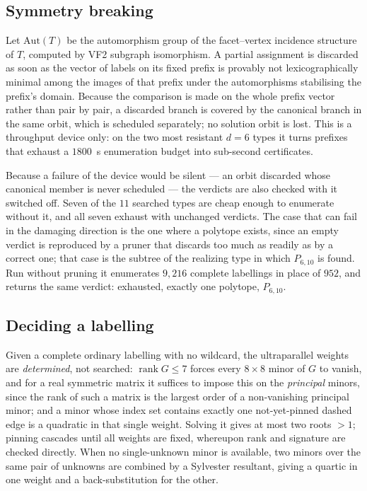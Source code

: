 \documentclass[11pt,reqno]{amsart}
\theoremstyle{plain}
\theoremstyle{definition}
\DeclareMathOperator{\rank}{rank}
\newcommand{\Gr}{G}
\newcommand{\PP}{P_{6,10}}
\newcommand{\NumRequired}{11}
\begin{document}
\subsection{Symmetry breaking}
Let $\mathrm{Aut}(T)$ be the automorphism group of the facet--vertex incidence
structure of $T$, computed by VF2 subgraph isomorphism. A partial assignment is
discarded as soon as the vector of labels on its fixed prefix is provably not
lexicographically minimal among the images of that prefix under the
automorphisms stabilising the prefix's domain. Because the comparison is made on
the whole prefix vector rather than pair by pair, a discarded branch is
covered by the canonical branch in the same orbit, which is scheduled
separately; no solution orbit is lost. This is a throughput device only: on the two
most resistant $d=6$ types it turns prefixes that exhaust a $1800$~s enumeration
budget into sub-second certificates.

Because a failure of the device would be silent --- an orbit discarded whose
canonical member is never scheduled --- the verdicts are also checked with it
switched off. Seven of the $\NumRequired$ searched types are cheap enough to
enumerate without it, and all seven exhaust with unchanged verdicts. The case that
can fail in the damaging direction is the one where a polytope exists, since an
empty verdict is reproduced by a pruner that discards too much as readily as by a
correct one; that case is the subtree of the realizing type in which $\PP$ is
found. Run without pruning it enumerates $9{,}216$ complete labellings in place of
$952$, and returns the same verdict: exhausted, exactly one polytope, $\PP$.

\subsection{Deciding a labelling}
\label{sec:decide}
Given a complete ordinary labelling with no wildcard, the ultraparallel weights
are \emph{determined}, not searched: $\rank\Gr\le7$ forces every
$8\times 8$ minor of $\Gr$ to vanish, and for a real symmetric matrix it suffices
to impose this on the \emph{principal} minors, since the rank of such a matrix is
the largest order of a non-vanishing principal minor; and a minor whose index set contains
exactly one not-yet-pinned dashed edge is a quadratic in that single weight.
Solving it gives at most two roots $>1$; pinning cascades until all weights are
fixed, whereupon rank and signature are checked directly. When no
single-unknown minor is available, two minors over the same pair of unknowns are
combined by a Sylvester resultant, giving a quartic in one weight and a
back-substitution for the other.
\end{document}
